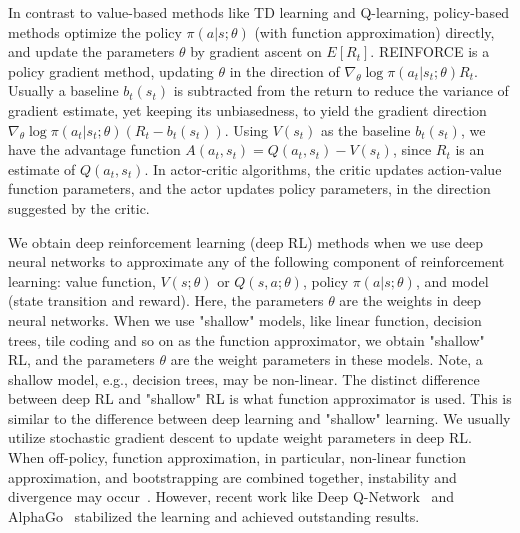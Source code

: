 In contrast to value-based methods like TD learning and Q-learning, policy-based methods optimize the policy $\pi(a|s; \theta)$ (with function approximation) directly, and update the parameters $\theta$ by gradient ascent on $E[R_t]$. REINFORCE is a policy gradient method, updating $\theta$ in the direction of $\nabla_{\theta} \log \pi(a_t|s_t; \theta) R_t$. Usually a baseline $b_t(s_t)$ is subtracted from the return to reduce the variance of gradient estimate, yet keeping its unbiasedness, to yield the gradient direction $\nabla_{\theta} \log \pi(a_t|s_t; \theta) (R_t - b_t(s_t))$. Using $V(s_t)$ as the baseline $b_t(s_t)$, we have the advantage function $A(a_t, s_t) = Q(a_t, s_t) - V(s_t)$, since $R_t$ is an estimate of $Q(a_t, s_t)$. In actor-critic algorithms, the critic updates action-value function parameters, and the actor updates policy parameters, in the direction suggested by the critic.

We obtain deep reinforcement learning (deep RL) methods when we use deep neural networks to approximate any of the following component of reinforcement learning: value function, $V(s; \theta)$ or $Q(s,a; \theta)$, policy $\pi(a|s; \theta)$, and model (state transition and reward). Here, the parameters $\theta$ are the weights in deep neural networks. When we use "shallow" models, like linear function, decision trees, tile coding and so on as the function approximator, we obtain "shallow" RL, and the parameters $\theta$ are the weight parameters in these models. Note, a shallow model, e.g., decision trees, may be non-linear. The distinct difference between deep RL and "shallow" RL is what function approximator is used. This is similar to the difference between deep learning and "shallow" learning. We usually utilize stochastic gradient descent to update weight parameters in deep RL. When off-policy, function approximation, in particular, non-linear function approximation, and bootstrapping are combined together, instability and divergence may occur~\citep{TDWithApproximator}. However, recent work like Deep Q-Network~\citep{Atari} and AlphaGo~\citep{AlphaGo} stabilized the learning and achieved outstanding results.

